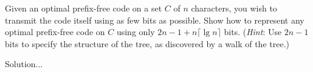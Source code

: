 \item[\textbf{Exercise 15.3-5}]
Given an optimal prefix-free code on a set $C$ of $n$ characters, you wish to
transmit the code itself using as few bits as possible. Show how to represent
any optimal prefix-free code on $C$ using only $2n - 1 + n \lceil \lg n \rceil$
bits. (\textit{Hint}: Use $2n - 1$ bits to specify the structure of the tree, as
discovered by a walk of the tree.)

\Solution

Solution...
